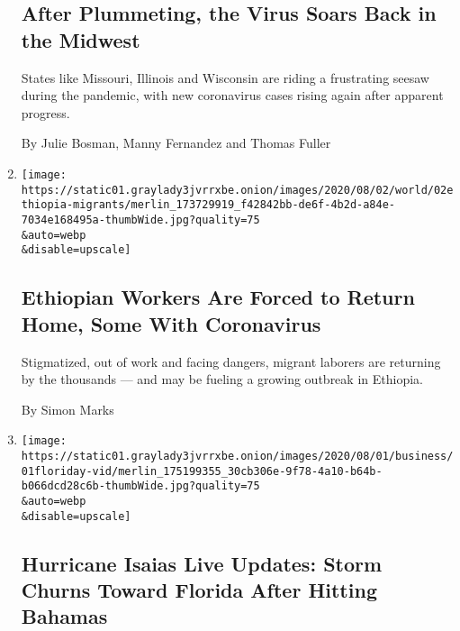 \begin{enumerate}
  \hypertarget{after-plummeting-the-virus-soars-back-in-the-midwest}{%
  \subsection{After Plummeting, the Virus Soars Back in the
  Midwest}\label{after-plummeting-the-virus-soars-back-in-the-midwest}}

  States like Missouri, Illinois and Wisconsin are riding a frustrating
  seesaw during the pandemic, with new coronavirus cases rising again
  after apparent progress.

  By Julie Bosman, Manny Fernandez and Thomas Fuller
\item
  \href{/2020/08/01/world/africa/ethiopian-migrant-workers-coronavirus.html}{}

  \texttt{[image: https://static01.graylady3jvrrxbe.onion/images/2020/08/02/world/02ethiopia-migrants/merlin\_173729919\_f42842bb-de6f-4b2d-a84e-7034e168495a-thumbWide.jpg?quality=75\\\&auto=webp\\\&disable=upscale]}

  \hypertarget{ethiopian-workers-are-forced-to-return-home-some-with-coronavirus}{%
  \subsection{Ethiopian Workers Are Forced to Return Home, Some With
  Coronavirus}\label{ethiopian-workers-are-forced-to-return-home-some-with-coronavirus}}

  Stigmatized, out of work and facing dangers, migrant laborers are
  returning by the thousands --- and may be fueling a growing outbreak
  in Ethiopia.

  By Simon Marks
\item
  \href{/2020/08/01/us/hurricane-isaias-track.html}{}

  \texttt{[image: https://static01.graylady3jvrrxbe.onion/images/2020/08/01/business/01floriday-vid/merlin\_175199355\_30cb306e-9f78-4a10-b64b-b066dcd28c6b-thumbWide.jpg?quality=75\\\&auto=webp\\\&disable=upscale]}

  \hypertarget{hurricane-isaias-live-updates-storm-churns-toward-florida-after-hitting-bahamas}{%
  \subsection{Hurricane Isaias Live Updates: Storm Churns Toward Florida
  After Hitting
  Bahamas}\label{hurricane-isaias-live-updates-storm-churns-toward-florida-after-hitting-bahamas}}


\end{enumerate}
